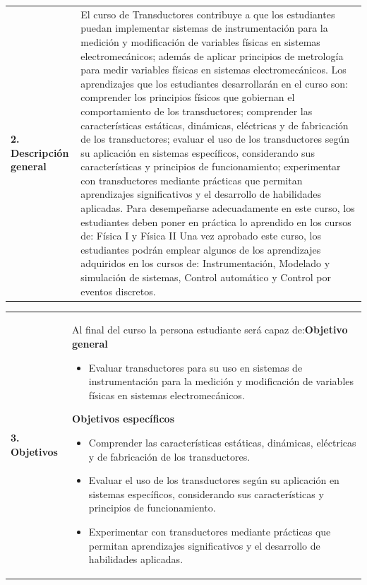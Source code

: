\documentclass[letterpaper]{article}%
\begin{document}
\begin{tabularx}{\textwidth}{p{3cm}p{13cm}}%
\par\fontsize{12}{14}\selectfont \textbf{\textcolor{parte}{2. Descripción general}}&El curso de Transductores contribuye a que los estudiantes puedan implementar sistemas de instrumentación para la medición y modificación de variables físicas en sistemas electromecánicos; además de aplicar principios de metrología para medir variables físicas en sistemas electromecánicos.
\newline%
\newline%
Los aprendizajes que los estudiantes desarrollarán en el curso son: comprender los principios físicos que gobiernan el comportamiento de los transductores; comprender las características estáticas, dinámicas, eléctricas y de fabricación de los transductores; evaluar el uso de los transductores según su aplicación en sistemas específicos, considerando sus características y principios de funcionamiento; experimentar con transductores mediante prácticas que permitan aprendizajes significativos y el desarrollo de habilidades aplicadas.
\newline%
\newline%
Para desempeñarse adecuadamente en este curso, los estudiantes deben poner en práctica lo aprendido en los cursos de: Física I y Física II 
\newline%
\newline%
Una vez aprobado este curso, los estudiantes podrán emplear algunos de los aprendizajes adquiridos en los cursos de: Instrumentación, Modelado y simulación de sistemas, Control automático y Control por eventos discretos.\\%
\end{tabularx}%
\vspace*{4mm}%
\newline%
\begin{tabularx}{\textwidth}{p{3cm}p{13cm}}%
\par\fontsize{12}{14}\selectfont \textbf{\textcolor{parte}{3. Objetivos}}&Al final del curso la persona estudiante será capaz de:\newline\newline \textbf{Objetivo general}\begin{itemize}\item Evaluar transductores para su uso en sistemas de instrumentación para la medición y modificación de variables físicas en sistemas electromecánicos.\end{itemize} \vspace{2mm}\textbf{Objetivos específicos}\begin{itemize}\item Comprender las características estáticas, dinámicas, eléctricas y de fabricación de los transductores.\item Evaluar el uso de los transductores según su aplicación en sistemas específicos, considerando sus características y principios de funcionamiento.\item Experimentar con transductores mediante prácticas que permitan aprendizajes significativos y el desarrollo de habilidades aplicadas.\end{itemize}\\%
\end{tabularx}%
\end{document}
